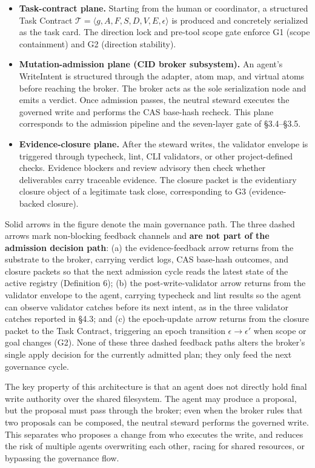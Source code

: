 \documentclass[9pt,letterpaper]{extarticle}
\begin{document}
\begin{itemize}
\item \textbf{Task-contract plane.} Starting from the human or coordinator, a structured Task Contract $\mathcal{T} = \langle g, A, F, S, D, V, E, \epsilon \rangle$ is produced and concretely serialized as the task card. The direction lock and pre-tool scope gate enforce G1 (scope containment) and G2 (direction stability).
\item \textbf{Mutation-admission plane (CID broker subsystem).} An agent's WriteIntent is structured through the adapter, atom map, and virtual atoms before reaching the broker. The broker acts as the sole serialization node and emits a verdict. Once admission passes, the neutral steward executes the governed write and performs the CAS base-hash recheck. This plane corresponds to the admission pipeline and the seven-layer gate of §3.4--§3.5.
\item \textbf{Evidence-closure plane.} After the steward writes, the validator envelope is triggered through typecheck, lint, CLI validators, or other project-defined checks. Evidence blockers and review advisory then check whether deliverables carry traceable evidence. The closure packet is the evidentiary closure object of a legitimate task close, corresponding to G3 (evidence-backed closure).
\end{itemize}

Solid arrows in the figure denote the main governance path. The three dashed arrows mark non-blocking feedback channels and \textbf{are not part of the admission decision path}: (a) the evidence-feedback arrow returns from the substrate to the broker, carrying verdict logs, CAS base-hash outcomes, and closure packets so that the next admission cycle reads the latest state of the active registry (Definition 6); (b) the post-write-validator arrow returns from the validator envelope to the agent, carrying typecheck and lint results so the agent can observe validator catches before its next intent, as in the three validator catches reported in §4.3; and (c) the epoch-update arrow returns from the closure packet to the Task Contract, triggering an epoch transition $\epsilon \to \epsilon'$ when scope or goal changes (G2). None of these three dashed feedback paths alters the broker's single apply decision for the currently admitted plan; they only feed the next governance cycle.

The key property of this architecture is that an agent does not directly hold final write authority over the shared filesystem. The agent may produce a proposal, but the proposal must pass through the broker; even when the broker rules that two proposals can be composed, the neutral steward performs the governed write. This separates {}who proposes a change{} from {}who executes the write{}, and reduces the risk of multiple agents overwriting each other, racing for shared resources, or bypassing the governance flow.
\end{document}
